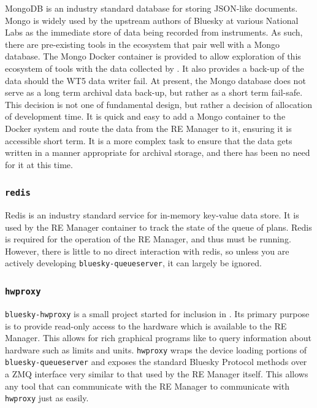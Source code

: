 MongoDB\cite{Dirolf_Chodorow_2010} is an industry standard database for storing JSON-like documents.
Mongo is widely used by the upstream authors of Bluesky at various National Labs as the immediate store of data being recorded from instruments.
As such, there are pre-existing tools in the ecosystem that pair well with a Mongo database.
The Mongo Docker container is provided to allow exploration of this ecosystem of tools with the data collected by \biab.
It also provides a back-up of the data should the WT5 data writer fail.
At present, the Mongo database does not serve as a long term archival data back-up, but rather as a short term fail-safe.
This decision is not one of fundamental design, but rather a decision of allocation of development time.
It is quick and easy to add a Mongo container to the Docker system and route the data from the RE Manager to it, ensuring it is accessible short term.
It is a more complex task to ensure that the data gets written in a manner appropriate for archival storage, and there has been no need for it at this time.

\subsubsection{\texttt{redis}}

Redis\cite{redis} is an industry standard service for in-memory key-value data store.
It is used by the RE Manager container to track the state of the queue of plans.
Redis is required for the operation of the RE Manager, and thus must be running.
However, there is little to no direct interaction with redis, so unless you are actively developing \texttt{bluesky-queueserver}, it can largely be ignored.

\subsubsection{\texttt{hwproxy}}

\texttt{bluesky-hwproxy}\cite{bluesky-hwproxy} is a small project started for inclusion in \biab.
Its primary purpose is to provide read-only access to the hardware which is available to the RE Manager.
This allows for rich graphical programs like \blueskycmds to query information about hardware such as limits and units.
\texttt{hwproxy} wraps the device loading portions of \texttt{bluesky-queueserver} and exposes the standard Bluesky Protocol methods over a ZMQ interface very similar to that used by the RE Manager itself.
This allows any tool that can communicate with the RE Manager to communicate with \texttt{hwproxy} just as easily.

